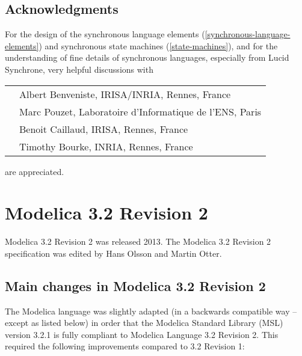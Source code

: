 \documentclass[../MLS.tex]{subfiles}
\begin{document}
\subsection{Acknowledgments}

For the design of the synchronous language elements (\autoref{synchronous-language-elements}) and
synchronous state machines (\autoref{state-machines}), and for the understanding of
fine details of synchronous languages, especially from Lucid Synchrone,
very helpful discussions with

\begin{longtable}{p{0.3cm}p{14cm}}
&Albert Benveniste, IRISA/INRIA, Rennes, France\\
&Marc Pouzet, Laboratoire d'Informatique de l'ENS, Paris\\
&Benoit Caillaud, IRISA, Rennes, France\\
&Timothy Bourke, INRIA, Rennes, France
\end{longtable}
are appreciated.

\section{Modelica 3.2 Revision 2}

Modelica 3.2 Revision 2 was released 2013. The Modelica 3.2 Revision 2
specification was edited by Hans Olsson and Martin Otter.

\subsection{Main changes in Modelica 3.2 Revision 2}

The Modelica language was slightly adapted (in a backwards compatible
way -- except as listed below) in order that the Modelica Standard
Library (MSL) version 3.2.1 is fully compliant to Modelica Language 3.2
Revision 2. This required the following improvements compared to 3.2
Revision 1:
\end{document}
